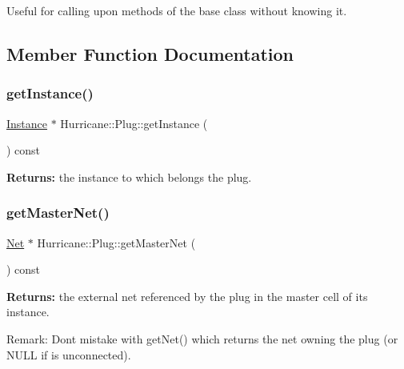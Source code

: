 Useful for calling upon methods of the base class without knowing it. 

\subsection{Member Function Documentation}
\mbox{\label{classHurricane_1_1Plug_a6ed1a11f86fbb80afacc9cc31b18a706}} 
\subsubsection{\texorpdfstring{get\+Instance()}{getInstance()}}
{\footnotesize\ttfamily \mbox{\hyperlink{classHurricane_1_1Instance}{Instance}} $\ast$ Hurricane\+::\+Plug\+::get\+Instance (\begin{DoxyParamCaption}{ }\end{DoxyParamCaption}) const\hspace{0.3cm}{\ttfamily [inline]}}

{\bfseries Returns\+:} the instance to which belongs the plug. \mbox{\label{classHurricane_1_1Plug_a57860e49d2674dcef6ea27d79c9d2ad8}} 
\subsubsection{\texorpdfstring{get\+Master\+Net()}{getMasterNet()}}
{\footnotesize\ttfamily \mbox{\hyperlink{classHurricane_1_1Net}{Net}} $\ast$ Hurricane\+::\+Plug\+::get\+Master\+Net (\begin{DoxyParamCaption}{ }\end{DoxyParamCaption}) const\hspace{0.3cm}{\ttfamily [inline]}}

{\bfseries Returns\+:} the external net referenced by the plug in the master cell of its instance.

\begin{DoxyParagraph}{Remark\+: Don\textquotesingle{}t mistake with get\+Net() which returns the net owning the }
plug (or N\+U\+LL if is unconnected). 
\end{DoxyParagraph}
\mbox{\label{classHurricane_1_1Plug_a51bd5d04a337544709950d7cace05f0d}} 
